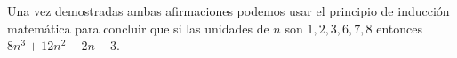 \documentclass[10pt,letterpaper,fleqn]{article}
\begin{document}
\begin{enumerate}
\begin{enumerate}
            Una vez demostradas ambas afirmaciones podemos usar el principio de inducción matemática para concluir que si las unidades de $n$ son $1,2,3,6,7,8$ entonces $8n^3 + 12n^2 - 2n -3$.

        \end{enumerate}

    \end{enumerate}            
\end{document}
